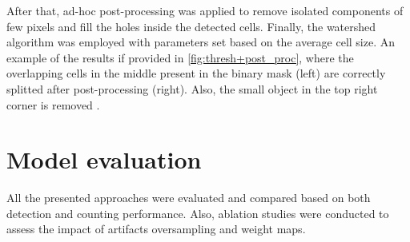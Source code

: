 After that, ad-hoc post-processing was applied to remove isolated components of few pixels and fill the holes inside the detected cells. 
Finally, the watershed algorithm \cite{watershed} was employed with parameters set based on the average cell size.
An example of the results if provided in \cref{fig:thresh+post_proc}, where the overlapping cells in the middle present in the binary mask (left) are correctly splitted after post-processing (right). Also, the small object in the top right corner is removed
.


\section{Model evaluation} \label{sec:model_evaluation}

All the presented approaches were evaluated and compared based on both detection and counting performance. 
Also, ablation studies were conducted to assess the impact of artifacts oversampling and weight maps.

